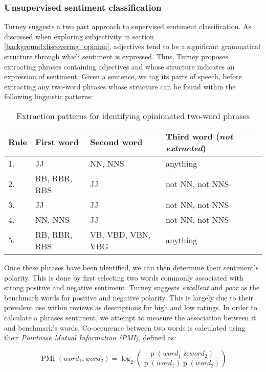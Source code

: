 \subsubsection{Unsupervised sentiment classification}

Turney \cite{Turney:2002vv} suggests a two part approach to supervised sentiment classification. As discussed when exploring subjectivity in section \ref{background:discovering_opinion}, adjectives tend to be a significant grammatical structure through which sentiment is expressed. Thus, Turney proposes extracting phrases containing adjectives and whose structure indicates an expression of sentiment. Given a sentence, we tag its parts of speech, before extracting any two-word phrases whose structure can be found within the following linguistic patterns:

\begin{table}[h]
	\caption{Extraction patterns for identifying opinionated two-word phrases}
	\label{background:patterns}
	\centering
	\begin{tabular}
		{ l | l l l }
		Rule & First word & Second word & Third word (\emph{not extracted}) \\ \hline
	  1. & JJ & NN, NNS & anything \\
		2. & RB, RBR, RBS & JJ & not NN, not NNS \\
		3. & JJ & JJ & not NN, not NNS \\
		4. & NN, NNS & JJ & not NN, not NNS \\
		5. & RB, RBR, RBS & VB, VBD, VBN, VBG & anything \\
	\end{tabular}
\end{table}

Once these phrases have been identified, we can then determine their sentiment's polarity. This is done by first selecting two words commonly associated with strong positive and negative sentiment. Turney suggests \emph{excellent} and \emph{poor} as the benchmark words for positive and negative polarity. This is largely due to their prevalent use within reviews as descriptions for high and low ratings. In order to calculate a phrases sentiment, we attempt to measure the association between it and benchmark's words. Co-occurence between two words is calculated using their \emph{Pointwise Mutual Information (PMI)}, defined as:

\begin{equation}
	\operatorname{PMI}(word_1, word_2) = \log_2 \left(\frac{\operatorname{p}(word_1 \textit{ \& } word_2)}{\operatorname{p}(word_1)\operatorname{p}(word_2)}\right)
\end{equation}


